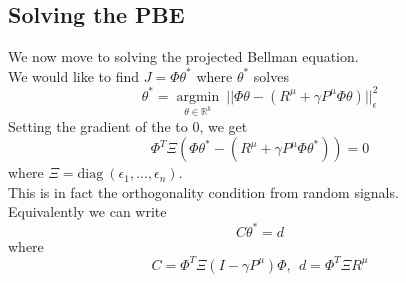 \subsection{Solving the PBE}
We now move to solving the projected Bellman equation.\\
We would like to find $J = \Phi \theta^*$ where $\theta^*$ solves
$$\theta^* = \underset{{\theta \in \mathbb{R}^k}}{\operatorname{argmin}} \ ||\Phi \theta - (R^\mu+\gamma P^\mu\Phi \theta)||_\epsilon^2$$
Setting the gradient of the to $0$, we get
$$\Phi^T \Xi (\Phi \theta^* - (R^\mu+\gamma P^\mu \Phi \theta^*)) = 0$$
where $\Xi = \textrm{diag} \ (\epsilon_1,...,\epsilon_n)$.\\
This is in fact the orthogonality condition from random signals.\\
Equivalently we can write
$$C \theta^* = d$$
where
$$C = \Phi^T \Xi(I-\gamma P^\mu) \Phi, \ \ d = \Phi^T\Xi R^\mu$$

